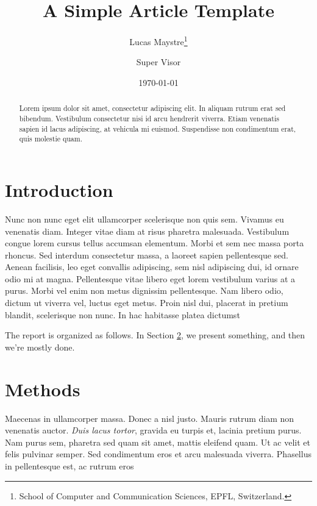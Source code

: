 \documentclass[12pt,a4paper,oneside]{article}
\title{A Simple Article Template}
\author{
Lucas Maystre\thanks{
School of Computer and Communication Sciences, EPFL, Switzerland.} \\
\email{address1@epfl.ch}
\and
Super Visor\footnotemark[1] \\
\email{address2@epfl.ch}
}
\date{\today}
\begin{document}
\maketitle

\begin{abstract}
Lorem ipsum dolor sit amet, consectetur adipiscing elit. In aliquam rutrum erat
sed bibendum. Vestibulum consectetur nisi id arcu hendrerit viverra. Etiam
venenatis sapien id lacus adipiscing, at vehicula mi euismod. Suspendisse non
condimentum erat, quis molestie quam.
\end{abstract}

\section{Introduction} %
\label{sec:intro}

Nunc non nunc eget elit ullamcorper scelerisque non quis sem. Vivamus eu
venenatis diam. Integer vitae diam at risus pharetra malesuada. Vestibulum
congue lorem cursus tellus accumsan elementum. Morbi et sem nec massa porta
rhoncus. Sed interdum \citep{lecun2004learning} consectetur massa, a laoreet
sapien pellentesque sed.  Aenean facilisis, leo eget convallis adipiscing, sem
nisl adipiscing dui, id ornare odio mi at magna. Pellentesque vitae libero eget
lorem vestibulum varius at a purus. Morbi vel enim non metus dignissim
pellentesque. Nam libero odio, dictum ut viverra vel, luctus eget metus. Proin
nisl dui, placerat in pretium blandit, scelerisque non nunc. In hac habitasse
platea dictumst

The report is organized as follows. In Section \ref{sec:methods}, we present
something, and then we're mostly done.


\section{Methods} %
\label{sec:methods}

Maecenas in ullamcorper massa. Donec a nisl justo. Mauris rutrum diam non
venenatis auctor. \emph{Duis lacus tortor}, gravida eu turpis et, lacinia
pretium purus. Nam purus sem, pharetra sed quam sit amet, mattis eleifend quam.
Ut ac velit et felis pulvinar semper. Sed condimentum eros et arcu malesuada
viverra.  Phasellus in pellentesque est, ac rutrum eros
\end{document}
